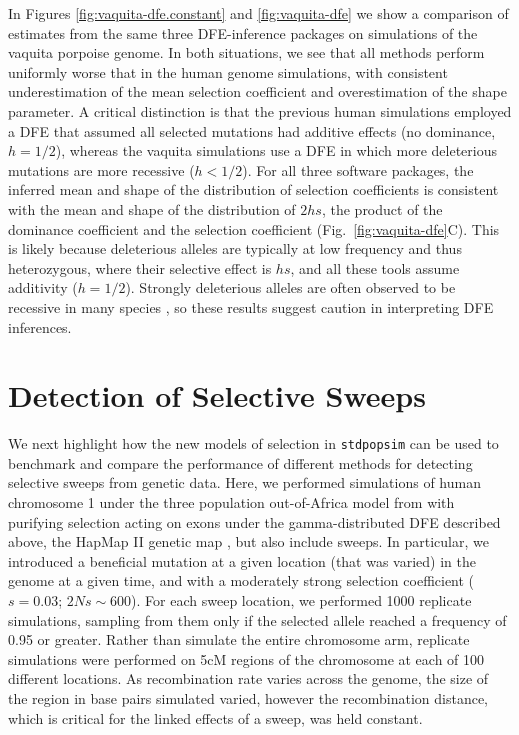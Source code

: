 \documentclass[hidelinks]{article}
\newcommand{\stdpopsim}{\texttt{stdpopsim}\xspace}
\begin{document}
    In Figures \ref{fig:vaquita-dfe.constant} and \ref{fig:vaquita-dfe} we show a comparison of estimates
    from the same three DFE-inference packages on simulations of the
    vaquita porpoise genome. In both situations, we see that all methods
    perform uniformly worse that in the human genome simulations, with consistent underestimation of the mean selection coefficient    
    and overestimation of the shape parameter. 
    A critical distinction is that the previous human simulations employed a DFE that assumed all selected mutations had additive effects
    (no dominance, $h = 1/2$), whereas the vaquita simulations use a DFE in which more deleterious mutations are more recessive ($h < 1/2$).
    For all three software packages, the inferred mean and shape of the distribution of selection coefficients 
    is consistent with the mean and shape of the distribution of $2 h s$, the product of the dominance coefficient
    and the selection coefficient (Fig.~\ref{fig:vaquita-dfe}C).
    This is likely because deleterious alleles are typically at low frequency and thus heterozygous, 
    where their selective effect is $h s$, and all these tools assume additivity  ($h = 1/2$).
    Strongly deleterious alleles are often observed to be recessive in many species \citep{mukai1972mutation},
    so these results suggest caution in interpreting DFE inferences.

\section*{Detection of Selective Sweeps}
    \label{sweeps}
    We next highlight how the new models of selection in \stdpopsim can be used to benchmark and compare the performance of different methods for detecting selective sweeps from genetic data.
    Here, we performed simulations of human chromosome 1 under the three population out-of-Africa model from \cite{gutenkunst2009inferring} with purifying selection acting on exons under the gamma-distributed DFE described above, the HapMap II genetic map \citep{international2007second}, but also include sweeps.
    In particular, we introduced a beneficial mutation at a given location (that was varied) in the genome at a given time, and with a moderately strong selection coefficient ($s = 0.03$; $2Ns \sim 600$).
    For each sweep location, we performed 1000 replicate simulations, sampling from them only if the selected allele reached a frequency of 0.95 or greater.
    Rather than simulate the entire chromosome arm, replicate simulations were performed on 5cM regions of the chromosome at each of 100 different locations.
    As recombination rate varies across the genome, the size of the region in base pairs simulated varied, however the recombination distance, which is critical for the linked effects of a sweep, was held constant.
 
\end{document}
